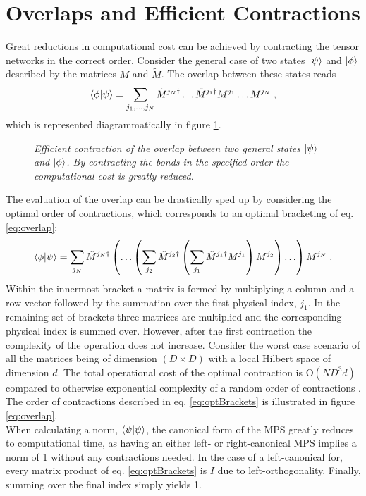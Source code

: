 \section{Overlaps and Efficient Contractions}
Great reductions in computational cost can be achieved by contracting the tensor networks in the correct order. Consider the general case of two states $\ket{\psi}$ and $\ket{\phi}$ described by the matrices $M$ and $\tilde{M}$. The overlap between these states reads
\begin{equation}
	\braket{\phi | \psi} = \sum_{j_1 , \ldots , j_N} \tilde{M}^{j_N \dag} \ldots \tilde{M}^{j_1 \dag} M^{j_1} \ldots M^{j_N} \; , 
	\label{eq:overlap}
\end{equation}
which is represented diagrammatically in figure \ref{fig:effCont}.
\begin{figure}[h!]
	\centering
	
	\caption{\textit{Efficient contraction of the overlap between two general states $\ket{\psi}$ and $\ket{\phi}$. By contracting the bonds in the specified order the computational cost is greatly reduced.}}
	\label{fig:effCont}
\end{figure}
The evaluation of the overlap can be drastically sped up by considering the optimal order of contractions, which corresponds to an optimal bracketing of eq. \eqref{eq:overlap}:
\begin{equation}
	\braket{\phi | \psi} = \sum_{j_N} \tilde{M}^{j_N \dag} \left( \ldots \left( \sum_{j_2} \tilde{M}^{j_2 \dag} \left( \sum_{j_1} \tilde{M}^{j_1 \dag} M^{j_1} \right) M^{j_2} \right) \ldots \right) M^{j_N} \; .
	\label{eq:optBrackets}
\end{equation}  
Within the innermost bracket a matrix is formed by multiplying a column and a row vector followed by the summation over the first physical index, $j_1$. In the remaining set of brackets three matrices are multiplied and the corresponding physical index is summed over. However, after the first contraction the complexity of the operation does not increase. Consider the worst case scenario of all the matrices being of dimension $(D \times D)$ with a local Hilbert space of dimension $d$. The total operational cost of the optimal contraction is $\mathrm{O}(N D^3 d)$ compared to otherwise exponential complexity of a random order of contractions \cite{Schollwock}. The order of contractions described in eq. \eqref{eq:optBrackets} is illustrated in figure \ref{eq:overlap}.\\
When calculating a norm, $\braket{\psi | \psi}$, the canonical form of the MPS greatly reduces to computational time, as having an either left- or right-canonical MPS implies a norm of 1 without any contractions needed. In the case of a left-canonical for, every matrix product of eq. \eqref{eq:optBrackets} is $I$ due to left-orthogonality. Finally, summing over the final index simply yields 1.



